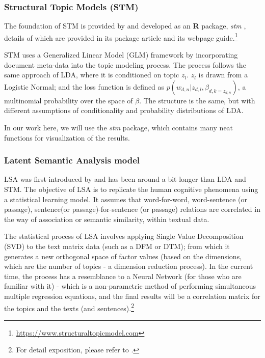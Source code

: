 \documentclass[
]{article}
\begin{document}
\hypertarget{structural-topic-models-stm}{%
\subsubsection{Structural Topic Models (STM)}\label{structural-topic-models-stm}}

The foundation of STM is provided by \citep{roberts2014} and developed as an \textbf{R} package, \emph{stm} \citep{stm}, details of which are provided in its package article \citep{roberts2019} and its webpage guide.\footnote{\url{https://www.structuraltopicmodel.com}}

STM uses a Generalized Linear Model (GLM) framework by incorporating document meta-data into the topic modeling process. The process follows the same approach of LDA, where it is conditioned on topic \(z_l\). \(z_l\) is drawn from a Logistic Normal; and the loss function is defined as \(p(w_{d,n}|z_{d,l},\beta_{d,k=z_{d,n}})\), a multinomial probability over the space of \(\beta\). The structure is the same, but with different assumptions of conditionality and probability distributions of LDA.

In our work here, we will use the \emph{stm} package, which contains many neat functions for visualization of the results.

\hypertarget{latent-semantic-analysis-model}{%
\subsubsection{Latent Semantic Analysis model}\label{latent-semantic-analysis-model}}

LSA was first introduced by \citep{landauer1998} and has been around a bit longer than LDA and STM. The objective of LSA is to replicate the human cognitive phenomena using a statistical learning model. It assumes that word-for-word, word-sentence (or passage), sentence(or passage)-for-sentence (or passage) relations are correlated in the way of association or semantic similarity, within textual data.

The statistical process of LSA involves applying Single Value Decomposition (SVD) to the text matrix data (such as a DFM or DTM); from which it generates a new orthogonal space of factor values (based on the dimensions, which are the number of topics - a dimension reduction process). In the current time, the process has a resemblance to a Neural Network (for those who are familiar with it) - which is a non-parametric method of performing simultaneous multiple regression equations, and the final results will be a correlation matrix for the topics and the texts (and sentences).\footnote{For detail exposition, please refer to \citep{landauer1998}.}
\end{document}
